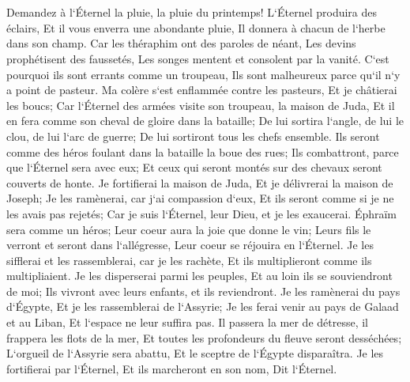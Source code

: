 \chapter{}

\verse Demandez à l`Éternel la pluie, la pluie du printemps! L`Éternel produira des éclairs, Et il vous enverra une abondante pluie, Il donnera à chacun de l`herbe dans son champ. 
\verse Car les théraphim ont des paroles de néant, Les devins prophétisent des faussetés, Les songes mentent et consolent par la vanité. C`est pourquoi ils sont errants comme un troupeau, Ils sont malheureux parce qu`il n`y a point de pasteur. 
\verse Ma colère s`est enflammée contre les pasteurs, Et je châtierai les boucs; Car l`Éternel des armées visite son troupeau, la maison de Juda, Et il en fera comme son cheval de gloire dans la bataille; 
\verse De lui sortira l`angle, de lui le clou, de lui l`arc de guerre; De lui sortiront tous les chefs ensemble. 
\verse Ils seront comme des héros foulant dans la bataille la boue des rues; Ils combattront, parce que l`Éternel sera avec eux; Et ceux qui seront montés sur des chevaux seront couverts de honte. 
\verse Je fortifierai la maison de Juda, Et je délivrerai la maison de Joseph; Je les ramènerai, car j`ai compassion d`eux, Et ils seront comme si je ne les avais pas rejetés; Car je suis l`Éternel, leur Dieu, et je les exaucerai. 
\verse Éphraïm sera comme un héros; Leur coeur aura la joie que donne le vin; Leurs fils le verront et seront dans l`allégresse, Leur coeur se réjouira en l`Éternel. 
\verse Je les sifflerai et les rassemblerai, car je les rachète, Et ils multiplieront comme ils multipliaient. 
\verse Je les disperserai parmi les peuples, Et au loin ils se souviendront de moi; Ils vivront avec leurs enfants, et ils reviendront. 
\verse Je les ramènerai du pays d`Égypte, Et je les rassemblerai de l`Assyrie; Je les ferai venir au pays de Galaad et au Liban, Et l`espace ne leur suffira pas. 
\verse Il passera la mer de détresse, il frappera les flots de la mer, Et toutes les profondeurs du fleuve seront desséchées; L`orgueil de l`Assyrie sera abattu, Et le sceptre de l`Égypte disparaîtra. 
\verse Je les fortifierai par l`Éternel, Et ils marcheront en son nom, Dit l`Éternel. 

\chapter{}

